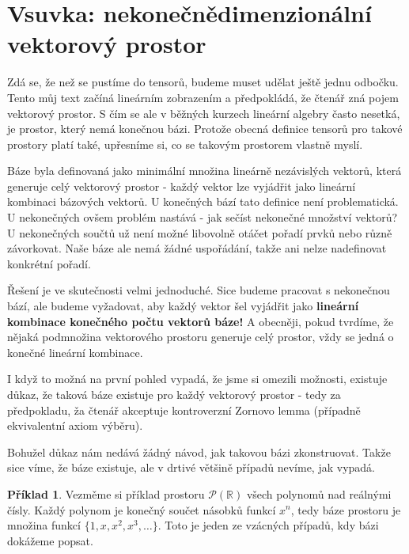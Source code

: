 \documentclass[a5paper,12pt]{amsbook}
\theoremstyle{definition}
\newtheorem{example}{Příklad}[chapter]
\begin{document}
\section{Vsuvka: nekonečnědimenzionální vektorový prostor}

\noindent
Zdá se, že než se pustíme do tensorů, budeme muset udělat ještě jednu odbočku. Tento můj text
začíná lineárním zobrazením a předpokládá, že čtenář zná pojem vektorový prostor. S čím se ale
v běžných kurzech lineární algebry často nesetká, je prostor, který nemá konečnou bázi. Protože
obecná definice tensorů pro takové prostory platí také, upřesníme si, co se takovým prostorem
vlastně myslí.

Báze byla definovaná jako minimální množina lineárně nezávislých vektorů, která generuje celý
vektorový prostor - každý vektor lze vyjádřit jako lineární kombinaci bázových vektorů. U konečných
bází tato definice není problematická. U nekonečných ovšem problém nastává - jak sečíst nekonečné
množství vektorů? U nekonečných součtů už není možné libovolně otáčet pořadí prvků nebo různě
závorkovat. Naše báze ale nemá žádné uspořádání, takže ani nelze nadefinovat konkrétní pořadí.

Řešení je ve skutečnosti velmi jednoduché. Sice budeme pracovat s nekonečnou bází, ale budeme
vyžadovat, aby každý vektor šel vyjádřit jako \textbf{lineární kombinace konečného počtu vektorů
báze!} A obecněji, pokud tvrdíme, že nějaká podmnožina vektorového prostoru generuje celý prostor,
vždy se jedná o konečné lineární kombinace.

I když to možná na první pohled vypadá, že jsme si omezili možnosti, existuje důkaz, že taková
báze existuje pro každý vektorový prostor - tedy za předpokladu, ža čtenář akceptuje kontroverzní
Zornovo lemma (případně ekvivalentní axiom výběru).

Bohužel důkaz nám nedává žádný návod, jak takovou bázi zkonstruovat. Takže sice víme, že báze
existuje, ale v drtivé většině případů nevíme, jak vypadá.

\begin{example}
Vezměme si příklad prostoru $\mathcal{P}(\mathbb{R})$ všech polynomů nad reálnými čísly.
Každý polynom je konečný součet násobků funkcí $x^n$, tedy báze prostoru je množina funkcí
$\{1, x, x^2, x^3, \hdots\}$. Toto je jeden ze vzácných případů, kdy bázi dokážeme popsat.
\end{example}
\end{document}
